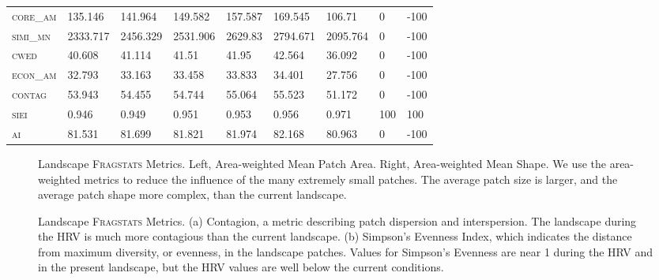\begin{landscape}
\begin{table}[!htbp]
\begin{tabular}{@{}llllll|lll@{}}
\small \textsc{core\_am}         & 135.146  & 141.964  & 149.582  & 157.587  & 169.545    & 106.71        & 0        & -100 \\
\small \textsc{simi\_mn}         & 2333.717 & 2456.329 & 2531.906 & 2629.83  & 2794.671   & 2095.764      & 0        & -100 \\
\small \textsc{cwed}             & 40.608   & 41.114   & 41.51    & 41.95    & 42.564     & 36.092        & 0        & -100 \\
\small \textsc{econ\_am}         & 32.793   & 33.163   & 33.458   & 33.833   & 34.401     & 27.756        & 0        & -100 \\
\small \textsc{contag}           & 53.943   & 54.455   & 54.744   & 55.064   & 55.523     & 51.172        & 0        & -100 \\
\small \textsc{siei}             & 0.946    & 0.949    & 0.951    & 0.953    & 0.956      & 0.971         & 100      & 100  \\
\small \textsc{ai}               & 81.531   & 81.699   & 81.821   & 81.974   & 82.168     & 80.963        & 0        & -100 \\ \bottomrule
\end{tabular}
\end{table}
\end{landscape}

\clearpage
\begin{figure}[!htbp]
  \centering
\caption{Landscape \textsc{Fragstats} Metrics. Left, Area-weighted Mean Patch Area. Right, Area-weighted Mean Shape. We use the area-weighted metrics to reduce the influence of the many extremely small patches. The average patch size is larger, and the average patch shape more complex, than the current landscape.} 
\label{fig:fragland_areashape}
\end{figure}

\begin{figure}[!htbp]
  \centering
\caption{Landscape \textsc{Fragstats} Metrics. (a) Contagion, a metric describing patch dispersion and interspersion. The landscape during the HRV is much more contagious than the current landscape. (b) Simpson's Evenness Index, which indicates the distance from maximum diversity, or evenness, in the landscape patches. Values for Simpson's Evenness are near 1 during the HRV and in the present landscape, but the HRV values are well below the current conditions.} 
\label{fig:fragland_contagsiei}
\end{figure}

